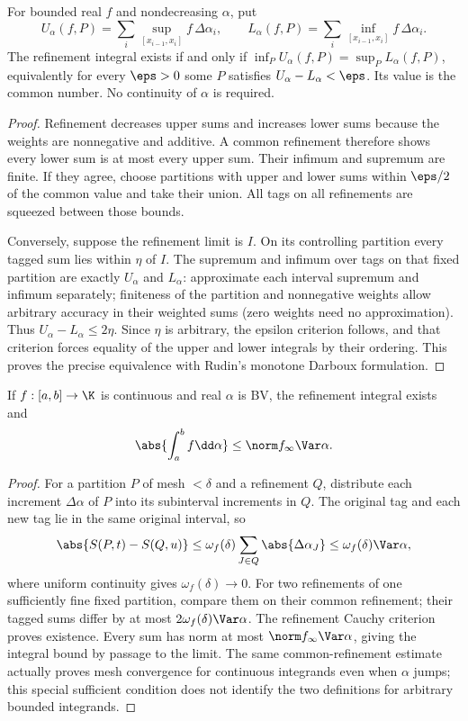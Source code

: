 \begin{theorem}
For bounded real $f$ and nondecreasing $\alpha$, put
\[U_\alpha(f,P)=\sum_i\sup_{[x_{i-1},x_i]}f\,\Delta\alpha_i,\qquad
L_\alpha(f,P)=\sum_i\inf_{[x_{i-1},x_i]}f\,\Delta\alpha_i.\]
The refinement integral exists if and only if $\inf_P U_\alpha(f,P)=\sup_P L_\alpha(f,P)$, equivalently for every $\eps>0$ some $P$ satisfies $U_\alpha-L_\alpha<\eps$. Its value is the common number. No continuity of $\alpha$ is required.
\end{theorem}
\begin{proof}
Refinement decreases upper sums and increases lower sums because the weights are nonnegative and additive. A common refinement therefore shows every lower sum is at most every upper sum. Their infimum and supremum are finite. If they agree, choose partitions with upper and lower sums within $\eps/2$ of the common value and take their union. All tags on all refinements are squeezed between those bounds.

Conversely, suppose the refinement limit is $I$. On its controlling partition every tagged sum lies within $\eta$ of $I$. The supremum and infimum over tags on that fixed partition are exactly $U_\alpha$ and $L_\alpha$: approximate each interval supremum and infimum separately; finiteness of the partition and nonnegative weights allow arbitrary accuracy in their weighted sums (zero weights need no approximation). Thus $U_\alpha-L_\alpha\leq2\eta$. Since $\eta$ is arbitrary, the epsilon criterion follows, and that criterion forces equality of the upper and lower integrals by their ordering. This proves the precise equivalence with Rudin's monotone Darboux formulation.
\end{proof}

\begin{theorem}
If $f:[a,b]\to\K$ is continuous and real $\alpha$ is BV, the refinement integral exists and
\[\abs{\int_a^b f\dd\alpha}\leq\norm f_\infty\Var\alpha.\]
\end{theorem}
\begin{proof}
For a partition $P$ of mesh $<\delta$ and a refinement $Q$, distribute each increment $\Delta\alpha$ of $P$ into its subinterval increments in $Q$. The original tag and each new tag lie in the same original interval, so
\[\abs{S(P,t)-S(Q,u)}\leq\omega_f(\delta)\sum_{J\in Q}\abs{\Delta\alpha_J}\leq\omega_f(\delta)\Var\alpha,\]
where uniform continuity gives $\omega_f(\delta)\to0$. For two refinements of one sufficiently fine fixed partition, compare them on their common refinement; their tagged sums differ by at most $2\omega_f(\delta)\Var\alpha$. The refinement Cauchy criterion proves existence. Every sum has norm at most $\norm f_\infty\Var\alpha$, giving the integral bound by passage to the limit. The same common-refinement estimate actually proves mesh convergence for continuous integrands even when $\alpha$ jumps; this special sufficient condition does not identify the two definitions for arbitrary bounded integrands.
\end{proof}

